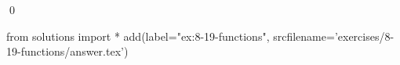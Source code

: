 
\begin{ex}
  \label{ex:8-19-functions}
  
  \qed
\end{ex}
\begin{python0}
from solutions import *
add(label="ex:8-19-functions",
    srcfilename='exercises/8-19-functions/answer.tex')
\end{python0}
